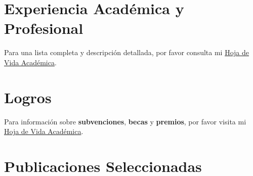 \documentclass[11pt,a4paper,]{awesome-cv}
\begin{document}
\section{Experiencia Académica y
Profesional}\label{experiencia-acaduxe9mica-y-profesional}

Para una lista completa y descripción detallada, por favor consulta mi
\href{https://jdleongomez.info/es/files/MVA_CV_es.pdf}{Hoja de Vida
Académica}.

\begin{cventries}
    \vspace{-4.0mm}
    \vspace{-4.0mm}
\end{cventries}

\section{Logros}\label{logros}

Para información sobre \textbf{subvenciones}, \textbf{becas} y
\textbf{premios}, por favor visita mi
\href{https://jdleongomez.info/es/files/MVA_CV_es.pdf}{Hoja de Vida
Académica}.

\section{Publicaciones Seleccionadas}\label{publicaciones-seleccionadas}
\end{document}
